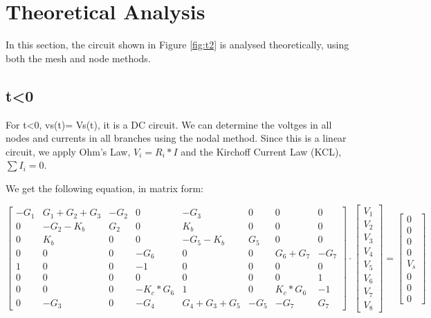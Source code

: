 \section{Theoretical Analysis}
\label{sec:analysis}

In this section, the circuit shown in Figure \ref{fig:t2} is analysed
theoretically, using both the mesh and node methods.

\subsection{t<0}
For t<0, vs(t)= Vs(t), it is a DC circuit. We can determine the voltges in all nodes and currents in all branches using the nodal method.
Since this is a linear circuit, we apply Ohm's Law, $V_i= R_i * I$ and the Kirchoff Current Law (KCL), $\sum I_i = 0$.

We get the following equation, in matrix form:

  \begin{equation}\label{eq:matrixeqn2}
\begin{bmatrix}
    -G_1 & G_1+G_2+G_3 & -G_2 & 0 & -G_3 & 0 & 0 & 0\\
    0 & -G_2-K_b & G_2 & 0 & K_b & 0 & 0 & 0\\
    0 & K_b & 0 & 0 & -G_5-K_b & G_5 & 0 & 0\\
    0 & 0 & 0 & -G_6 & 0 & 0 & G_6+G_7 & -G_7\\
    1 & 0 & 0 & -1 & 0 & 0 & 0 & 0\\
    0 & 0 & 0 & 0 & 0 & 0 & 0 & 1\\
    0 & 0 & 0 & -K_c*G_6 & 1 & 0 & K_c*G_6 & -1\\
    0 & -G_3 & 0 & -G_4 & G_4+G_3+G_5 & -G_5 & -G_7 & G_7
\end{bmatrix}
\cdot
\begin{bmatrix}
V_1 \\
V_2 \\
V_3 \\
V_4 \\
V_5 \\
V_6 \\
V_7 \\
V_8 
    \end{bmatrix}
=
    \begin{bmatrix}
0 \\
0 \\
0 \\
0\\
V_s \\
0 \\
0 \\
0
    \end{bmatrix}
  \end{equation}


